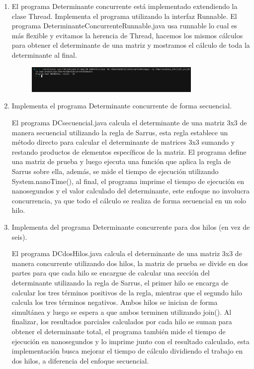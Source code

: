 \begin{enumerate}
    \hfill    

    \item El programa Determinante concurrente está implementado extendiendo la clase Thread. Implementa el programa utilizando la interfaz Runnable.
    El programa DeterminanteConcurrenteRunnable.java usa runnable lo cual es más flexible y evitamos la herencia de Thread, hacemos los mismos cálculos para obtener el determinante de una matriz y mostramos el cálculo de toda la determinante al final.

    \begin{figure}[h]
        \centering
        \includegraphics[width=0.8\textwidth]{resources/Ej4.png}
    \end{figure}

    \hfill
    
    \item Implementa el programa Determinante concurrente de forma secuencial.

    El programa DCsecuencial.java calcula el determinante de una matriz 3x3 de manera secuencial utilizando la regla de Sarrus, esta regla establece un método          directo para calcular el determinante de matrices 3x3 sumando y restando productos de elementos específicos de la matriz. El programa define una matriz de          prueba y luego ejecuta una función que aplica la regla de Sarrus sobre ella, además, se mide el tiempo de ejecución utilizando System.nanoTime(), al final, 
      el programa imprime el tiempo de ejecución en nanosegundos y el valor calculado del determinante, este enfoque no involucra concurrencia, ya que todo el 
      cálculo se realiza de forma secuencial en un solo hilo.

    \hfill
    
    \item Implementa del programa Determinante concurrente para dos hilos (en vez de seis).

    El programa DCdosHilos.java calcula el determinante de una matriz 3x3 de manera concurrente utilizando dos hilos, la matriz de prueba se divide en dos partes      para que cada hilo se encargue de calcular una sección del determinante utilizando la regla de Sarrus, el primer hilo se encarga de calcular los tres términos     positivos de la regla, mientras que el segundo hilo calcula los tres términos negativos. Ambos hilos se inician de forma simultánea y luego se espera a que        ambos terminen utilizando join(). Al finalizar, los resultados parciales calculados por cada hilo se suman para obtener el determinante total, el programa         también mide el tiempo de ejecución en nanosegundos y lo imprime junto con el resultado calculado, esta implementación busca mejorar el tiempo de cálculo          dividiendo el trabajo en dos hilos, a diferencia del enfoque secuencial.


\end{enumerate}
